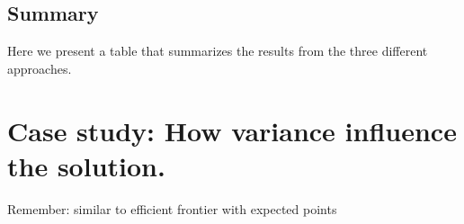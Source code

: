 \subsection{Summary}
Here we present a table that summarizes the results from the three different approaches. 

\section{Case study: How variance influence the solution.}

Remember: similar to efficient frontier with expected points